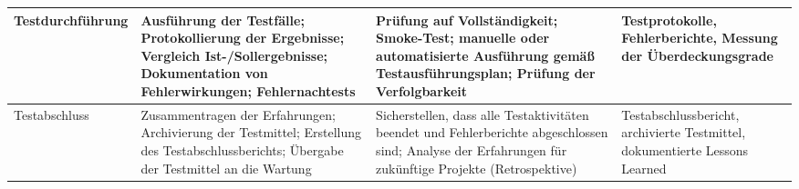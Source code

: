 \documentclass[
	fontsize=12pt,          %
	paper=a4,               %
	numbers=noenddot,       %
	listof=totoc,           %
	listof=entryprefix,     %
	listof=nochaptergap,    %
	bibliography=totoc,     %
	parskip=half,           %
	openany                 %
]{scrbook}
\begin{document}
{\begin{longtable}{| p{3cm} | p{3.8cm} | p{3.8cm} | p{3.4cm} |}
	Testdurchführung &
	Ausführung der Testfälle; Protokollierung der Ergebnisse; Vergleich Ist-/Sollergebnisse; Dokumentation von Fehlerwirkungen; Fehlernachtests &
	Prüfung auf Vollständigkeit; Smoke-Test; manuelle oder automatisierte Ausführung gemäß Testausführungsplan; Prüfung der Verfolgbarkeit &
	Testprotokolle, Fehlerberichte, Messung der Überdeckungsgrade \\
	\hline

	Testabschluss &
	Zusammentragen der Erfahrungen; Archivierung der Testmittel; Erstellung des Testabschlussberichts; Übergabe der Testmittel an die Wartung &
	Sicherstellen, dass alle Testaktivitäten beendet und Fehlerberichte abgeschlossen sind; Analyse der Erfahrungen für zukünftige Projekte (Retrospektive) &
	Testabschlussbericht, archivierte Testmittel, dokumentierte Lessons Learned \\

\end{longtable}
}


\end{document}
